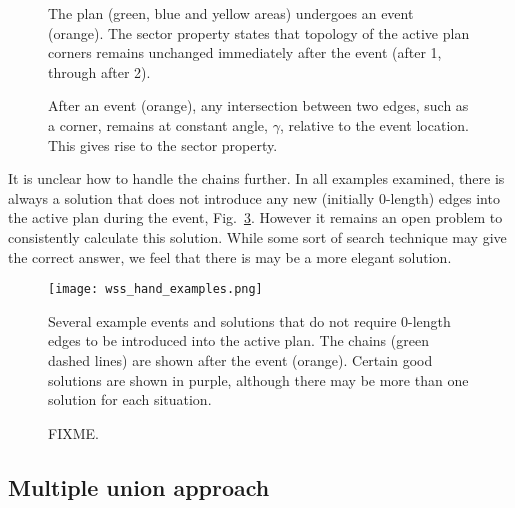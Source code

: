 \begin{figure}
  \centering
  \def\svgwidth{1.0\columnwidth}
  
  \caption[An example of the sector property]{\label{fig:wss_sector}The plan (green, blue and yellow areas) undergoes an event (orange). The sector property states that topology of the active plan corners remains unchanged immediately after the event (after 1, through after 2).}
\end{figure}

\begin{figure}
  \centering
  \def\svgwidth{0.5\columnwidth}
  
  \caption[The sector property]{\label{fig:skel_sector_2}After an event (orange), any intersection between two edges, such as a corner, remains at constant angle, $\gamma$, relative to the event location. This gives rise to the sector property.}
\end{figure}

It is unclear how to handle the chains further. In all examples examined, there is always a solution that does not introduce any new (initially 0-length) edges into the active plan during the event, Fig.~\ref{fig:wss_hand_examples}. However it remains an open problem to consistently calculate this solution. While some sort of search technique may give the correct answer, we feel that there is may be a more elegant solution.

\begin{figure}
  \centering %
  \texttt{[image: wss\_hand\_examples.png]}
  \caption[Manual examples of good MWSS solutions]{\label{fig:wss_hand_examples} Several example events and solutions that do not require 0-length edges to be introduced into the active plan. The chains (green dashed lines) are shown after the event (orange). Certain good solutions are shown in purple, although there may be more than one solution for each situation.}
\end{figure}

\begin{figure}
  \centering
  \def\svgwidth{0.5\columnwidth}
  
  \caption[The sector property]{\label{fig:wss_incremental}FIXME.}
\end{figure}

\subsection{Multiple union approach}

